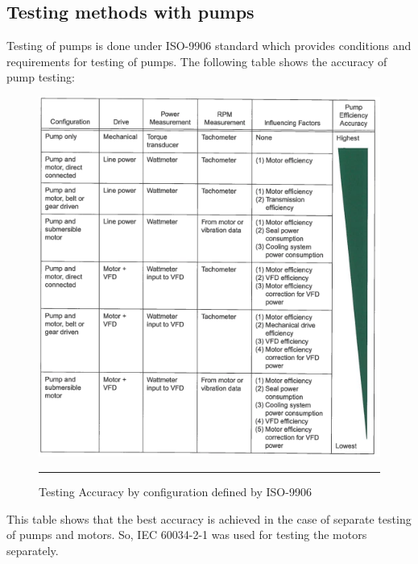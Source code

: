\subsection{Testing methods with pumps}
Testing of pumps is done under ISO-9906\cite{iso9906} standard which provides conditions and requirements for testing of pumps. The following table shows the accuracy of pump testing:
\begin{figure}[htbp]
	\centering
		\includegraphics[width = 5.5in]{./Figures/MS/25.png}
		\rule{35em}{0.5pt}
	\caption{Testing Accuracy by configuration defined by ISO-9906}
	\label{fig:Testing Accuracy by configuration defined by ISO-9906}
\end{figure}
This table shows that the best accuracy is achieved in the case of separate testing of pumps and motors. So, IEC 60034-2-1 was used for testing the motors separately.